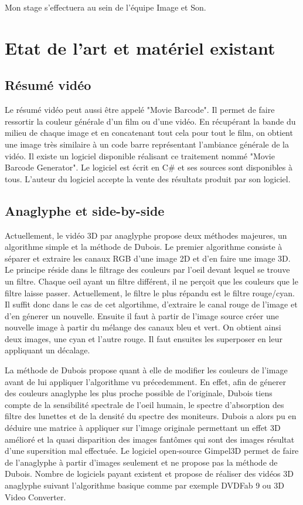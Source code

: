 \documentclass[10pt,a4paper]{article}
\begin{document}
Mon stage s'effectuera au sein de l'équipe Image et Son.

\section{Etat de l'art et matériel existant}
\subsection{Résumé vidéo}
Le résumé vidéo peut aussi être appelé "Movie Barcode". Il permet de faire ressortir la couleur générale d'un film ou d'une vidéo. En récupérant la bande du milieu de chaque image et en concatenant tout cela pour
tout le film, on obtient une image très similaire à un code barre représentant l'ambiance générale de la vidéo.
Il existe un logiciel disponible réalisant ce traitement nommé "Movie Barcode Generator". Le logiciel est écrit en C\# et ses sources sont disponibles à tous. L'auteur du logiciel accepte la vente des
résultats produit par son logiciel.

\subsection{Anaglyphe et side-by-side}
\label{anasbs}
Actuellement, le vidéo 3D par anaglyphe propose deux méthodes majeures, un algorithme simple et la méthode de Dubois.
Le premier algorithme consiste à séparer et extraire les canaux RGB d'une image 2D et d'en faire une image 3D. Le principe réside dans le filtrage des couleurs par l'oeil devant lequel se trouve un filtre.
Chaque oeil ayant un filtre différent, il ne perçoit que les couleurs que le filtre laisse passer. Actuellement, le filtre le plus répandu est le filtre rouge/cyan.
Il suffit donc dans le cas de cet algortihme, d'extraire le canal rouge de l'image et d'en génerer un nouvelle. Ensuite il faut à partir de l'image source créer une nouvelle image à partir du mélange des canaux bleu et vert.
On obtient ainsi deux images, une cyan et l'autre rouge. Il faut ensuites les superposer en leur appliquant un décalage.\newline

La méthode de Dubois propose quant à elle de modifier les couleurs de l'image avant de lui appliquer l'algorithme vu précedemment.
En effet, afin de génerer des couleurs anaglyphe les plus proche possible de l'originale, Dubois tiens compte de la sensibilité spectrale de l'oeil humain,
le spectre d'absorption des filtre des lunettes et de la densité du spectre des moniteurs.
Dubois a alors pu en déduire une matrice à appliquer sur l'image originale permettant un effet 3D amélioré et la quasi
disparition des images fantômes qui sont des images résultat d'une supersition mal effectuée.
Le logiciel open-source Gimpel3D permet de faire de l'anaglyphe à partir d'images seulement et ne propose pas la méthode de Dubois. Nombre de logiciels payant existent et propose de réaliser des vidéos 3D
anaglyphe suivant l'algorithme basique comme par exemple DVDFab 9 ou  3D Video Converter.\newline
\end{document}
